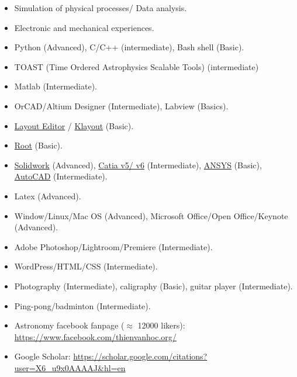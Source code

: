 \documentclass[paper=a4,fontsize=11pt]{scrartcl} %
\newcommand{\sepspace}{\vspace*{1em}}		%
\begin{document}
\begin{itemize}
    \item Simulation of physical processes/ Data analysis.
    \item Electronic and mechanical experiences.
\end{itemize}
\sepspace
\begin{itemize}
    \item Python (Advanced), C/C++ (intermediate), Bash shell (Basic).
    \item TOAST (Time Ordered Astrophysics Scalable Tools) (intermediate)
    \item Matlab (Intermediate).
    \item OrCAD/Altium Designer (Intermediate), Labview (Basics).
    \item \href{https://layouteditor.com/}{Layout Editor} / \href{https://www.klayout.de/}{Klayout} (Basic).
    \item \href{https://root.cern.ch/root/html/guides/users-guide/ROOTUsersGuide.html#savingreading-histograms-tofrom-a-file}{Root} (Basic).
    \item \href{https://www.solidworks.com/}{Solidwork} (Advanced), \href{https://www.3ds.com/products-services/catia/?wockw=card_content_cta_1_url%3A%22https%3A%2F%2Fblogs.3ds.com%2Fcatia%2F%22}{Catia v5/ v6} (Intermediate), \href{https://www.ansys.com/}{ANSYS} (Basic), \href{https://www.autodesk.com/}{AutoCAD} (Intermediate).
\end{itemize}
\sepspace

\begin{itemize}
    \item Latex (Advanced).
    \item Window/Linux/Mac OS (Advanced), Microsoft Office/Open Office/Keynote (Advanced).
    \item Adobe Photoshop/Lightroom/Premiere (Intermediate).
    \item WordPress/HTML/CSS (Intermediate).
\end{itemize}
\sepspace

\begin{itemize}
    \item Photography (Intermediate), caligraphy (Basic), guitar player (Intermediate).
    \item Ping-pong/badminton (Intermediate).
    \item Astronomy facebook fanpage ($\approx$ 12000 likers): {\color{blue} \url{https://www.facebook.com/thienvanhoc.org/} }
\end{itemize}
\sepspace
\begin{itemize}
    \item Google Scholar: {\color{blue} \url{https://scholar.google.com/citations?user=X6_u9x0AAAAJ&hl=en} }
\end{itemize}
\end{document}
